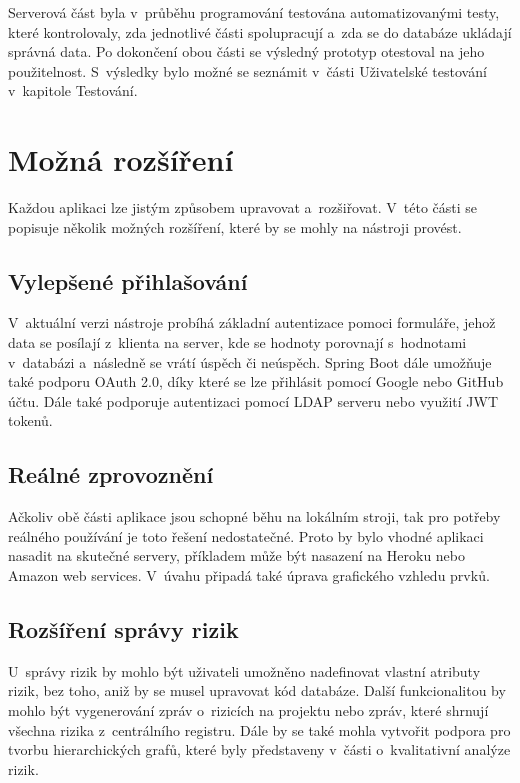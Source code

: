 Serverová část byla v~průběhu programování testována automatizovanými testy, které kontrolovaly, zda jednotlivé části spolupracují a~zda se do databáze ukládají správná data. Po dokončení obou části se výsledný prototyp otestoval na jeho použitelnost. S~výsledky bylo možné se seznámit v~části Uživatelské testování v~kapitole Testování.

\section{Možná rozšíření}

Každou aplikaci lze jistým způsobem upravovat a~rozšiřovat. V~této části se popisuje několik možných rozšíření, které by se mohly na nástroji provést.

\subsection*{Vylepšené přihlašování}

V~aktuální verzi nástroje probíhá základní autentizace pomoci formuláře, jehož data se posílají z~klienta na server, kde se hodnoty porovnají s~hodnotami v~databázi a~následně se vrátí úspěch či neúspěch. Spring Boot dále umožňuje také podporu OAuth 2.0, díky které se lze přihlásit pomocí Google nebo GitHub účtu. Dále také podporuje autentizaci pomocí LDAP serveru nebo využití JWT tokenů.

\subsection*{Reálné zprovoznění}

Ačkoliv obě části aplikace jsou schopné běhu na lokálním stroji, tak pro potřeby reálného používání je toto řešení nedostatečné. Proto by bylo vhodné aplikaci nasadit na skutečné servery, příkladem může být nasazení na Heroku nebo Amazon web services. V~úvahu připadá také úprava grafického vzhledu prvků.

\subsection*{Rozšíření správy rizik}

U~správy rizik by mohlo být uživateli umožněno nadefinovat vlastní atributy rizik, bez toho, aniž by se musel upravovat kód databáze. Další funkcionalitou by mohlo být vygenerování zpráv o~rizicích na projektu nebo zpráv, které shrnují všechna rizika z~centrálního registru. Dále by se také mohla vytvořit podpora pro tvorbu hierarchických grafů, které byly představeny v~části o~kvalitativní analýze rizik.

